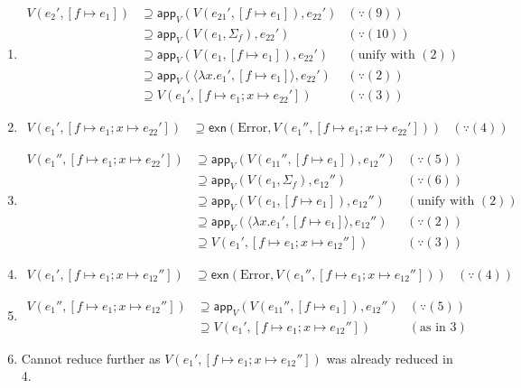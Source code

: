 \documentclass{article}
\begin{document}
\begin{enumerate}
  \item
        \begin{align*}
          V(e_{2}',[f \mapsto e_{1}])
          &\supseteq \mathsf{app}_{V}(V(e_{21}',[f \mapsto e_{1}]),e_{22}') & (\because (9))\\
          &\supseteq \mathsf{app}_{V}(V(e_{1},\Sigma_{f}),e_{22}') & (\because (10))\\
          &\supseteq \mathsf{app}_{V}(V(e_{1},[f\mapsto e_{1}]),e_{22}') & (\text{unify with }(2))\\
          &\supseteq \mathsf{app}_{V}(\langle \lambda x. e_{1}',[f \mapsto e_{1}]\rangle , e_{22}') & (\because (2))\\
          &\supseteq V(e_{1}',[f\mapsto e_{1};x\mapsto e_{22}']) & (\because (3))
        \end{align*}
  \item
        \begin{align*}
          V(e_{1}',[f\mapsto e_{1};x\mapsto e_{22}'])
          &\supseteq \mathsf{exn}(\text{Error},V(e_{1}'',[f\mapsto e_{1};x\mapsto e_{22}'])) & (\because (4))
        \end{align*}
  \item
        \begin{align*}
          V(e_{1}'',[f\mapsto e_{1};x\mapsto e_{22}'])
          &\supseteq \mathsf{app}_{V}(V(e_{11}'',[f\mapsto e_{1}]),e_{12}'') & (\because (5))\\
          &\supseteq \mathsf{app}_{V}(V(e_{1},\Sigma_{f}),e_{12}'') & (\because (6))\\
          &\supseteq \mathsf{app}_{V}(V(e_{1},[f\mapsto e_{1}]),e_{12}'') & (\text{unify with }(2))\\
          &\supseteq \mathsf{app}_{V}(\langle \lambda x.e_{1}',[f\mapsto e_{1}]\rangle,e_{12}'') & (\because (2))\\
          &\supseteq V(e_{1}',[f \mapsto e_{1};x \mapsto e_{12}'']) & (\because (3))
        \end{align*}
  \item
        \begin{align*}
          V(e_{1}',[f \mapsto e_{1};x \mapsto e_{12}''])
          &\supseteq \mathsf{exn}(\text{Error},V(e_{1}'',[f\mapsto e_{1};x\mapsto e_{12}''])) & (\because (4))
        \end{align*}
  \item
        \begin{align*}
          V(e_{1}'',[f\mapsto e_{1};x\mapsto e_{12}''])
          &\supseteq \mathsf{app}_{V}(V(e_{11}'',[f\mapsto e_{1}]),e_{12}'') & (\because (5))\\
          &\supseteq V(e_{1}',[f\mapsto e_{1};x\mapsto e_{12}'']) & (\text{as in }3)
        \end{align*}
  \item Cannot reduce further as $V(e_{1}',[f \mapsto e_{1};x\mapsto e_{12}''])$ was already reduced in 4.
\end{enumerate}
\end{document}
